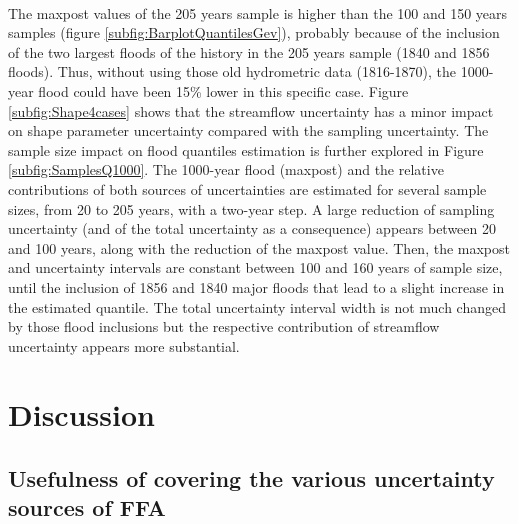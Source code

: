 \documentclass[11pt]{article}
\begin{document}
        \paragraph{}
        The maxpost values of the 205 years sample is higher than the 100 and 150 years samples (figure \ref{subfig:BarplotQuantilesGev}), probably because of the inclusion of the two largest floods of the history in the 205 years sample (1840 and 1856 floods). Thus, without using those old hydrometric data (1816-1870), the 1000-year flood could have been 15\% lower in this specific case. Figure \ref{subfig:Shape4cases} shows that the streamflow uncertainty has a minor impact on shape parameter uncertainty compared with the sampling uncertainty. The sample size impact on flood quantiles estimation is further explored in Figure \ref{subfig:SamplesQ1000}. The 1000-year flood (maxpost) and the relative contributions of both sources of uncertainties are estimated for several sample sizes, from 20 to 205 years, with a two-year step. A large reduction of sampling uncertainty (and of the total uncertainty as a consequence) appears between 20 and 100 years, along with the reduction of the maxpost value. Then, the maxpost and uncertainty intervals are constant between 100 and 160 years of sample size, until the inclusion of 1856 and 1840 major floods that lead to a slight increase in the estimated quantile. The total uncertainty interval width is not much changed by those flood inclusions but the respective contribution of streamflow uncertainty appears more substantial.

\section{Discussion}
\label{sec:Discussion}
    \subsection{Usefulness of covering the various uncertainty sources of FFA}

\end{document}
